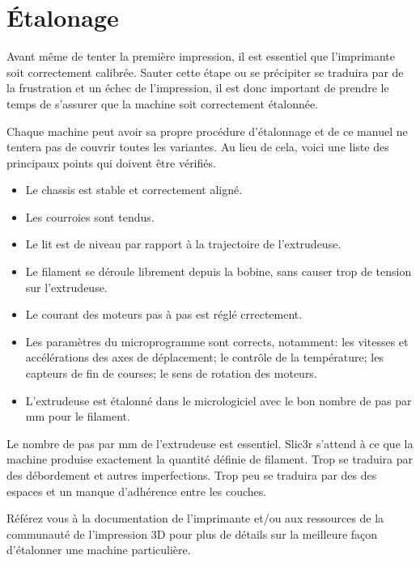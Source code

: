 
\section{\'Etalonage}
\label{calibration}

Avant m\^eme de tenter la premi\`ere impression, il est essentiel que l'imprimante soit correctement calibr\'ee. Sauter cette \'etape ou se pr\'ecipiter se traduira par de la frustration et un \'echec de l'impression, il est donc important de prendre le temps de s'assurer que la machine soit correctement \'etalonn\'ee.

Chaque machine peut avoir sa propre proc\'edure d'\'etalonnage et de ce manuel ne tentera pas de couvrir toutes les variantes. Au lieu de cela, voici une liste des principaux points qui doivent \^etre v\'erifi\'es.

\begin{itemize}
\item Le chassis est stable et correctement align\'e.
\item Les courroies sont tendus.
\item Le lit est de niveau par rapport \`a la trajectoire de l'extrudeuse.
\item Le filament se d\'eroule librement depuis la bobine, sans causer trop de tension sur l'extrudeuse.
\item Le courant des moteurs pas \`a pas est r\'egl\'e crrectement.
\item Les param\`etres du microprogramme sont corrects, notamment: les vitesses et acc\'el\'erations des axes de d\'eplacement; le contr\^ole de la temp\'erature; les capteurs de fin de courses; le sens de rotation des moteurs.
\item L'extrudeuse est \'etalonn\'e dans le micrologiciel avec le bon nombre de pas par mm pour le filament.
\end{itemize}

Le nombre de pas par mm de l'extrudeuse est essentiel. Slic3r s'attend \`a ce que la machine produise exactement la quantit\'e d\'efinie de filament. Trop se traduira par des d\'ebordement et autres imperfections. Trop peu se traduira par des des espaces et un manque d'adh\'erence entre les couches.

R\'ef\'erez vous \`a la documentation de l'imprimante et/ou aux ressources de la communaut\'e de l'impression 3D pour plus de d\'etails sur la meilleure fa\c{c}on d'\'etalonner une machine particuli\`ere.
